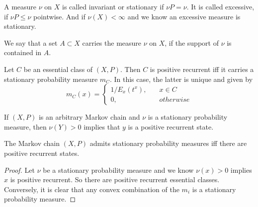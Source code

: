 \documentclass[lang=en, color=blue, ]{elegantbook}
\begin{document}
\begin{definition}
    A measure $\nu$ on $X$ is called invariant or stationary if $\nu P = \nu$. It is called excessive, if $\nu P \leq \nu$ pointwise. And if $\nu(X) < \infty$ and we know an excessive measure is stationary.\par
    We say that a set $A\subset X$ carries the measure $\nu$ on $X$, if the support of $\nu$ is contained in $A$.
\end{definition}
\begin{theorem}
    Let $C$ be an essential class of $(X,P)$. Then $C$ is positive recurrent iff it carries a stationary probability measure $m_C$. In this case, the latter is unique and given by
    \[
    m_C(x) = \begin{cases}
        1/E_x(t^x),\quad &x\in C \\
        0,&otherwise
    \end{cases}
    \]\par
    If $(X,P)$ is an arbitrary Markov chain and $\nu$ is a stationary probability measure, then $\nu(Y) > 0$ implies that $y$ is a positive recurrent state.
\end{theorem}

\begin{corollary}
    The Markov chain $(X,P)$ admits stationary probability measures iff there are positive recurrent states.\par
\end{corollary}
\begin{proof}
    Let $\nu$ be a stationary probability measure and we know $\nu(x) > 0$ implies $x$ is positive recurrent. So there are positive recurrent essential classes. Conversely, it is clear that any convex combination of the $m_i$ is a stationary probability measure. 
\end{proof}
\end{document}
